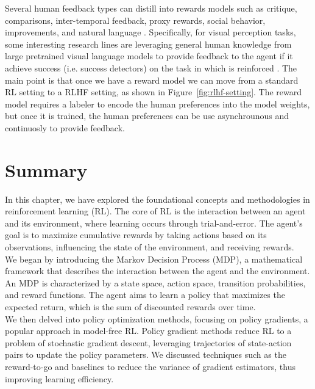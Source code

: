 \noindent Several human feedback types can distill into rewards models such as critique, comparisons, inter-temporal feedback, proxy rewards, social behavior, improvements, and natural language \cite{kaufmann2023survey}. Specifically,
for visual perception tasks, some interesting research lines are leveraging general human knowledge from large pretrained visual language models to provide feedback to the agent if it achieve success (i.e. success detectors) on the task in which is reinforced \cite{du2023visionlanguagemodelssuccessdetectors}. 
The main point is that once we have a reward model we can move from a standard RL setting to a RLHF setting, as shown in Figure~\ref{fig:rlhf-setting}. The
reward model requires a labeler to encode the human preferences into the
model weights, but once it is trained, the human preferences can be use asynchrounous and continuosly to provide feedback. \\



\section{Summary}

In this chapter, we have explored the foundational concepts and methodologies in reinforcement learning (RL). The core of RL is the interaction between an agent and its environment, where learning occurs through trial-and-error. The agent's goal is to maximize cumulative rewards by taking actions based on its observations, influencing the state of the environment, and receiving rewards. \\

\noindent We began by introducing the Markov Decision Process (MDP), a mathematical framework that describes the interaction between the agent and the environment. An MDP is characterized by a state space, action space, transition probabilities, and reward functions. The agent aims to learn a policy that maximizes the expected return, which is the sum of discounted rewards over time. \\

\noindent We then delved into policy optimization methods, focusing on policy gradients, a popular approach in model-free RL. Policy gradient methods reduce RL to a problem of stochastic gradient descent, leveraging trajectories of state-action pairs to update the policy parameters. We discussed techniques such as the reward-to-go and baselines to reduce the variance of gradient estimators, thus improving learning efficiency. \\

